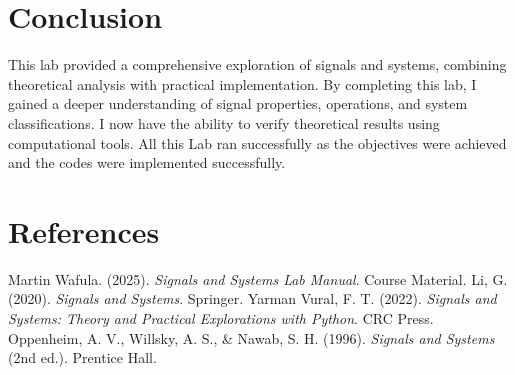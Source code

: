 \documentclass[12pt]{article}
\begin{document}
\section{Conclusion}
This lab provided a comprehensive exploration of signals and systems, combining theoretical analysis with practical implementation. By completing this lab, I gained a
 deeper understanding of signal properties, operations, and system classifications. I now have the ability to verify theoretical results using computational tools. All this Lab ran successfully as the objectives were achieved and the codes were implemented successfully.
 
 \section{References}
\begin{thebibliography}{9}

Martin Wafula. (2025). \textit{Signals and Systems Lab Manual}. Course Material.
Li, G. (2020). \textit{Signals and Systems}. Springer.
Yarman Vural, F. T. (2022). \textit{Signals and Systems: Theory and Practical Explorations with Python}. CRC Press.
Oppenheim, A. V., Willsky, A. S., & Nawab, S. H. (1996). \textit{Signals and Systems} (2nd ed.). Prentice Hall.

\end{thebibliography}

 
\end{document}
